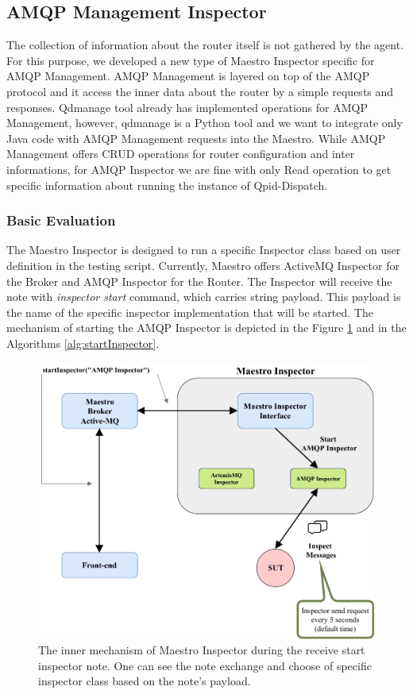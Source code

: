 \subsection{AMQP Management Inspector}
\label{AMQP Management Inspector}
The collection of information about the router itself is not gathered by the agent. For this purpose, we developed a new type of Maestro Inspector specific for AMQP Management. AMQP Management is layered on top of the AMQP protocol and it access the inner data about the router by a simple requests and responses. Qdmanage tool already has implemented operations for AMQP Management, however, qdmanage is a Python tool and we want to integrate only Java code with AMQP Management requests into the Maestro. While AMQP Management offers CRUD operations for router configuration and inter informations, for AMQP Inspector we are fine with only Read operation to get specific information about running the instance of Qpid-Dispatch.

\subsubsection*{Basic Evaluation}
The Maestro Inspector is designed to run a specific Inspector class based on user definition in the testing script. Currently, Maestro offers ActiveMQ Inspector for the Broker and AMQP Inspector for the Router. The Inspector will receive the note with \emph{inspector start} command, which carries string payload. This payload is the name of the specific inspector implementation that will be started. The mechanism of starting the AMQP Inspector is depicted in the Figure \ref{fig:inspector_start} and in the Algorithms \ref{alg:startInspector}.

\begin{figure}[H]
  \centering
  \includegraphics[width=13cm]{obrazky-figures/inspector_start.pdf}
  \caption{The inner mechanism of Maestro Inspector during the receive start inspector note. One can see the note exchange and choose of specific inspector class based on the note's payload.}
  \label{fig:inspector_start}
\end{figure}

